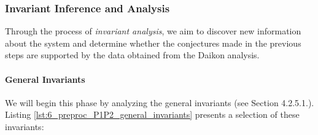 \begin{comment}
		C25 & There is a correlation between the trend of \texttt{P1\_P101} and the trend of \texttt{P2\_MV201}. & Observation derived from the plot\\ 
		\hline
		
		C26 & \texttt{P2\_MV201} is responsible for \textbf{filling a tank} that is \textit{not} part of this subsystem. & Sensors \texttt{P2\_AIT202} and \texttt{P2\_AIT203} do not exhibit an increasing trend when the valve is ON, and there is no apparent correspondence between the trend of the valve and the trend of \texttt{P1\_LIT101}.\\ 
		\hline
		
		C27 & \texttt{P2\_AIT201} is a sensor that measures \textbf{some property of the water}. & Measurement does not show a cyclic pattern in its measurements.\\
		\hline
		
		C28 & \texttt{P2\_AIT202} is a sensor that measures \textbf{some property of the water}. & Very narrow range between maximum and minimum values (point 4 of the third premise in Section \ref{par:6_conventions})\\
		\hline
		
		C29 & The trend of \texttt{P2\_AIT202} and \texttt{P2\_AIT203} follows the trend of \texttt{P2\_P20x} pumps & Observation derived from the plot\\ 
		\hline
		
	\caption{}
	\label{table:6_P1P2_summarize_graphs}
	\end{longtable}
}
\end{comment}
		
\subsubsection{Invariant Inference and Analysis}
\label{subsubsec:6_P1P2_invariants}
Through the process of \textit{invariant analysis}, we aim to discover new information about the system and determine whether the conjectures made in the previous steps are supported by the data obtained from the Daikon analysis.

\paragraph{General Invariants}
\label{par:6_P1P2_general_invariant}
We will begin this phase by analyzing the general invariants (see Section 4.2.5.1.). Listing \ref{lst:6_preproc_P1P2_general_invariants} presents a selection of these invariants:

